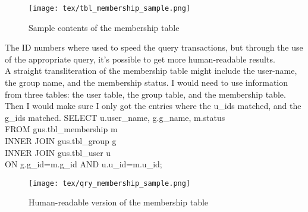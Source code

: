\documentclass[12pt, twoside, letterpaper]{report}
\begin{document}
\begin{wrapfigure}[9]{r}{2.5in}
\begin{center}
\caption{Sample contents of the membership table}
\texttt{[image: tex/tbl\_membership\_sample.png]}
\end{center}
\end{wrapfigure}
The ID numbers where used to speed the query transactions,
but through the use of the appropriate query, it's possible
to get more human-readable results.\\
A straight transliteration of the membership table might
include the user-name, the group name, and the membership
status. I would need to use information from three tables:
the user table, the group table, and the membership table.
Then I would make sure I only got the entries where the
u\_ids matched, and the g\_ids matched.
SELECT u.user\_name, g.g\_name, m.status\\
FROM gus.tbl\_membership m\\
    INNER JOIN gus.tbl\_group g\\
    INNER JOIN gus.tbl\_user u\\
      ON g.g\_id=m.g\_id AND u.u\_id=m.u\_id;\\

\begin{figure}[h]
\begin{center}
\caption{Human-readable version of the membership table}
\texttt{[image: tex/qry\_membership\_sample.png]}
\end{center}
\end{figure}
\end{document}

